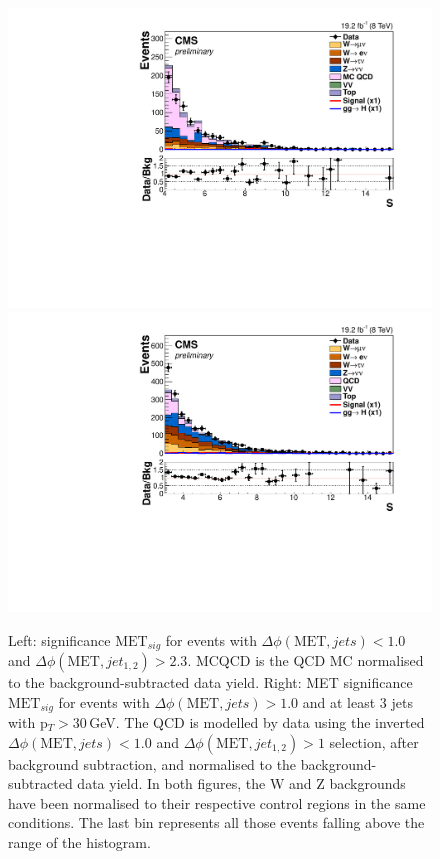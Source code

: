 \begin{figure}[!htp]
\centering
\includegraphics[width=.49\textwidth]{Chapter07/Images/output_invqcd_qcd_metnomu_significance.pdf}
\includegraphics[width=.49\textwidth]{Chapter07/Images/output_invqcd_3j_nunu_metnomu_significance.pdf}
\caption{Left: \MET significance $\text{MET}_{sig}$ for events with $\Delta\phi(\text{MET},jets)<1.0$ and $\Delta\phi(\text{MET},jet_{1,2})>2.3$. MCQCD is the QCD MC normalised to the background-subtracted data yield. Right: \gls{MET} significance $\text{MET}_{sig}$ for events with $\Delta\phi(\text{MET},jets)>1.0$ and at least 3 jets with p$_T>30$\,GeV. The QCD is modelled by data using the inverted $\Delta\phi(\text{MET},jets)<1.0$ and $\Delta\phi(\text{MET},jet_{1,2})>1$ selection, after background subtraction, and normalised to the background-subtracted data yield. In both figures, the W and Z backgrounds have been normalised to their respective control regions in the same conditions. The last bin represents all those events falling above the range of the histogram.}
\label{fig:invqcd}
\end{figure}

%

